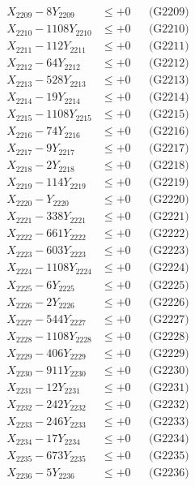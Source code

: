 \documentclass[a4paper,10pt]{article}
\begin{document}
{\begin{align}
X_{2209} - 8Y_{2209} &\leq +0 && \text{(G2209)} \\
X_{2210} - 1108Y_{2210} &\leq +0 && \text{(G2210)} \\
\allowbreak
X_{2211} - 112Y_{2211} &\leq +0 && \text{(G2211)} \\
X_{2212} - 64Y_{2212} &\leq +0 && \text{(G2212)} \\
X_{2213} - 528Y_{2213} &\leq +0 && \text{(G2213)} \\
X_{2214} - 19Y_{2214} &\leq +0 && \text{(G2214)} \\
X_{2215} - 1108Y_{2215} &\leq +0 && \text{(G2215)} \\
X_{2216} - 74Y_{2216} &\leq +0 && \text{(G2216)} \\
X_{2217} - 9Y_{2217} &\leq +0 && \text{(G2217)} \\
X_{2218} - 2Y_{2218} &\leq +0 && \text{(G2218)} \\
X_{2219} - 114Y_{2219} &\leq +0 && \text{(G2219)} \\
X_{2220} - Y_{2220} &\leq +0 && \text{(G2220)} \\
\allowbreak
X_{2221} - 338Y_{2221} &\leq +0 && \text{(G2221)} \\
X_{2222} - 661Y_{2222} &\leq +0 && \text{(G2222)} \\
X_{2223} - 603Y_{2223} &\leq +0 && \text{(G2223)} \\
X_{2224} - 1108Y_{2224} &\leq +0 && \text{(G2224)} \\
X_{2225} - 6Y_{2225} &\leq +0 && \text{(G2225)} \\
X_{2226} - 2Y_{2226} &\leq +0 && \text{(G2226)} \\
X_{2227} - 544Y_{2227} &\leq +0 && \text{(G2227)} \\
X_{2228} - 1108Y_{2228} &\leq +0 && \text{(G2228)} \\
X_{2229} - 406Y_{2229} &\leq +0 && \text{(G2229)} \\
X_{2230} - 911Y_{2230} &\leq +0 && \text{(G2230)} \\
\allowbreak
X_{2231} - 12Y_{2231} &\leq +0 && \text{(G2231)} \\
X_{2232} - 242Y_{2232} &\leq +0 && \text{(G2232)} \\
X_{2233} - 246Y_{2233} &\leq +0 && \text{(G2233)} \\
X_{2234} - 17Y_{2234} &\leq +0 && \text{(G2234)} \\
X_{2235} - 673Y_{2235} &\leq +0 && \text{(G2235)} \\
X_{2236} - 5Y_{2236} &\leq +0 && \text{(G2236)} \\

\end{align}}
\end{document}
